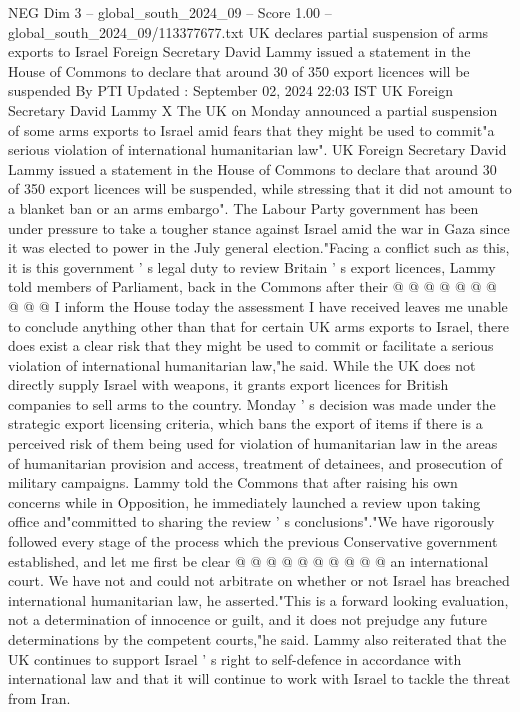 \begin{textsample}{NEG Dim 3 – global\_south\_2024\_09 – Score 1.00 – global\_south\_2024\_09/113377677.txt}  \label{ex:f3_neg_137}
UK declares partial suspension of arms exports to Israel Foreign Secretary David Lammy issued a statement in the House of Commons to declare that around 30 of 350 export licences will be suspended By PTI Updated : September 02, 2024 22:03 IST UK Foreign Secretary David Lammy X The UK on Monday announced a partial suspension of some arms exports to Israel amid fears that they might be used to commit"a serious violation of international humanitarian law".
UK Foreign Secretary David Lammy issued a statement in the House of Commons to declare that around 30 of 350 export licences will be suspended, while stressing that it did not amount to a blanket ban or an arms embargo".
The Labour Party government has been under pressure to take a tougher stance against Israel amid the war in Gaza since it was elected to power in the July general election."Facing a conflict such as this, it is this government ' s legal duty to review Britain ' s export licences, Lammy told members of Parliament, back in the Commons after their @ @ @ @ @ @ @ @ @ @ I inform the House today the assessment I have received leaves me unable to conclude anything other than that for certain UK arms exports to Israel, there does exist a clear risk that they might be used to commit or facilitate a serious violation of international humanitarian law,"he said.
While the UK does not directly supply Israel with weapons, it grants export licences for British companies to sell arms to the country.
Monday ' s decision was made under the strategic export licensing criteria, which bans the export of items if there is a perceived risk of them being used for violation of humanitarian law in the areas of humanitarian provision and access, treatment of detainees, and prosecution of military campaigns.
Lammy told the Commons that after raising his own concerns while in Opposition, he immediately launched a review upon taking office and"committed to sharing the review ' s conclusions"."We have rigorously followed every stage of the process which the previous Conservative government established, and let me first be clear @ @ @ @ @ @ @ @ @ @ an international court.
We have not and could not arbitrate on whether or not Israel has breached international humanitarian law, he asserted."This is a forward looking evaluation, not a determination of innocence or guilt, and it does not prejudge any future determinations by the competent courts,"he said.
Lammy also reiterated that the UK continues to support Israel ' s right to self-defence in accordance with international law and that it will continue to work with Israel to tackle the threat from Iran.

\end{textsample}
